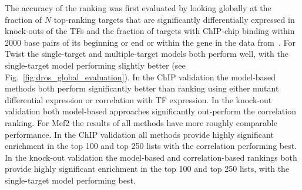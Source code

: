 \documentclass{pnastwo}
\begin{document}
\begin{article}
The accuracy of the ranking was first evaluated by looking globally at the fraction of $N$ top-ranking targets that are significantly differentially expressed in knock-outs of the TFs and the fraction
of targets with ChIP-chip binding within 2000 base
pairs of its beginning or end or within the gene in the data
from~\cite{Zinzen2009}. For Twist the single-target and
multiple-target models both perform well, with the single-target model
performing slightly better (see
Fig.~\ref{fig:dros_global_evaluation}). In the ChIP validation the
model-based methods both perform significantly better than ranking
using either mutant differential expression or correlation with TF
expression. In the knock-out validation both model-based approaches
significantly out-perform the correlation ranking. For Mef2 the results of all
methods have more roughly comparable performance. In the ChIP validation all
methods provide highly significant enrichment in the top 100 and top
250 lists with the correlation performing best. In the knock-out
validation the model-based and correlation-based rankings both provide
highly significant enrichment in the top 100 and top 250 lists, with
the single-target model performing best.


\end{article}
\end{document}
